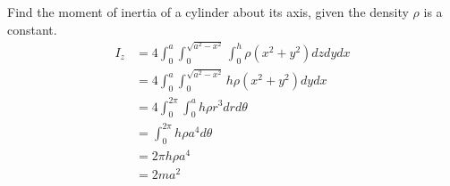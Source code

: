 \documentclass[12pt]{article}
\begin{document}
\begin{ex}
	Find the moment of inertia of a cylinder about its axis, given the density $\rho$ is a constant.
	\begin{align*}
		I_z &= 4\int_0^a \int_0^{\sqrt{a^2-x^2}} \int_0^h \rho(x^2+y^2)dzdydx \\
		    &= 4\int_0^a \int_0^{\sqrt{a^2-x^2}} h\rho(x^2+y^2)dydx \\
		    &= 4 \int_0^{2\pi} \int_0^a h\rho r^3 drd\theta \\
		    &= \int_0^{2\pi} h\rho a^4 d\theta \\
		    &= 2\pi h\rho a^4 \\
		    &= 2ma^2 \\
	\end{align*}
\end{ex}
\end{document}
